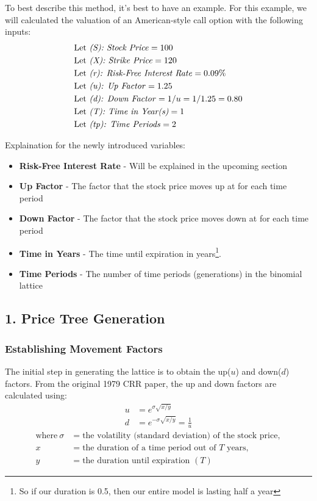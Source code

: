 \documentclass[12pt, letterpaper]{article}\usepackage{float}
\begin{document}
\bigskip

To best describe this method, it's best to have an example.
For this example, we will calculated the valuation of an American-style call option with the following inputs:
\begin{align*}
  \setlength{\jot}{20pt}
  \text{Let } &\text{\textit{(S): Stock Price}} = 100 \\
  \text{Let } &\text{\textit{(X): Strike Price}} = 120 \\
  \text{Let } &\text{\textit{(r): Risk-Free Interest Rate}} = 0.09\% \\
  \text{Let } &\text{\textit{(u): Up Factor}} = 1.25 \\
  \text{Let } &\text{\textit{(d): Down Factor}} = 1/u = 1/1.25 = 0.80 \\
  \text{Let } &\text{\textit{(T): Time in Year(s)}}  = 1 \\
  \text{Let } &\text{\textit{(tp): Time Periods}}  = 2 
\end{align*}

\bigskip

Explaination for the newly introduced variables:
\begin{itemize}[label={}]
  \item \textbf{Risk-Free Interest Rate} - Will be explained in the upcoming section
  \item \textbf{Up Factor} - The factor that the stock price moves up at for each time period
  \item \textbf{Down Factor} - The factor that the stock price moves down at for each time period
  \item \textbf{Time in Years} - The time until expiration in years\footnote{So if our duration is 0.5, then our entire model is lasting half a year}.
  \item \textbf{Time Periods} - The number of time periods (generations) in the binomial lattice
\end{itemize}

\pagebreak
\subsection*{1. Price Tree Generation}
\subsubsection*{Establishing Movement Factors} \label{establishing movement factors}
The initial step in generating the lattice is to obtain the up(${u}$) and down(${d}$) factors. From the original 1979 CRR paper, the up and down factors are calculated using\cite{bopmwikipedia, crrpaper}:
\begin{align*}
  u &= e^{\sigma\sqrt{x/y}} \\
  d &= e^{-\sigma\sqrt{x/y}} = \frac{1}{u}
\end{align*}
\begin{align*}
  \text{where}~\sigma &= \text{the volatility (standard deviation) of the stock price}, \\
  x &= \text{the duration of a time period out of ${T}$ years}, \\
  y &= \text{the duration until expiration ${(T)}$}
\end{align*}
\end{document}
